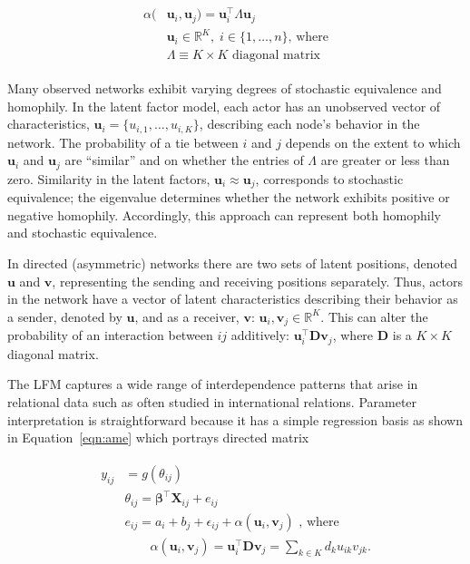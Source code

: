 \documentclass[12pt]{amsart}
\begin{document}
\begin{align}
\begin{aligned}
	\alpha(&\textbf{u}_{i}, \textbf{u}_{j}) = \textbf{u}_{i}^{\top} \Lambda \textbf{u}_{j} \\
	&\textbf{u}_{i} \in \mathbb{R}^{K}, \; i \in \{1, \ldots, n \} \text{, where}\\
	 &\Lambda \equiv K \times K \text{ diagonal matrix}
\label{eqn:latAlpha}
\end{aligned}
\end{align}

Many observed  networks exhibit varying degrees of stochastic equivalence and homophily.  In the latent factor model, each actor has an unobserved vector of characteristics, $\textbf{u}_{i} = \{u_{i,1}, \ldots, u_{i,K} \}$, describing each node's behavior in the network. The probability of a tie between $i$ and $j$ depends on the extent to which $\textbf{u}_{i}$ and $\textbf{u}_{j}$ are ``similar'' and on whether the entries of $\Lambda$ are greater or less than zero. Similarity in the latent factors, $\textbf{u}_{i} \approx \textbf{u}_{j}$, corresponds to stochastic equivalence; the eigenvalue determines whether the network exhibits positive or negative homophily. Accordingly, this approach can represent both homophily and stochastic equivalence. 

In directed (asymmetric) networks there are two sets of latent positions, denoted $\textbf{u}$ and $\textbf{v}$, representing the sending and receiving positions separately.  Thus, actors in the network have a vector of latent characteristics describing their behavior as a sender, denoted by $\textbf{u}$, and as a receiver, $\textbf{v}$: $\textbf{u}_{i}, \textbf{v}_{j} \in \mathbb{R}^{K}$. This can alter the probability of an interaction between $ij$ additively: $\textbf{u}_{i}^{\top} \textbf{D} \textbf{v}_{j}$, where $\textbf{D}$ is a $K \times K$ diagonal matrix.

The LFM captures a wide range of interdependence patterns that arise in relational data such as often studied in international relations. Parameter interpretation is straightforward because it has a simple regression basis as shown in Equation~\ref{eqn:ame} which portrays directed matrix \:

\begin{align}
\begin{aligned}
	y_{ij} &= g(\theta_{ij}) \\
	&\theta_{ij} = \bm\beta^{\top} \mathbf{X}_{ij} + e_{ij} \\
	&e_{ij} = a_{i} + b_{j}  + \epsilon_{ij} + \alpha(\textbf{u}_{i}, \textbf{v}_{j}) \text{  , where } \\
	&\qquad \alpha(\textbf{u}_{i}, \textbf{v}_{j}) = \textbf{u}_{i}^{\top} \textbf{D} \textbf{v}_{j} = \sum_{k \in K} d_{k} u_{ik} v_{jk}. \\
\label{eqn:ame}
\end{aligned}
\end{align}
\end{document}
